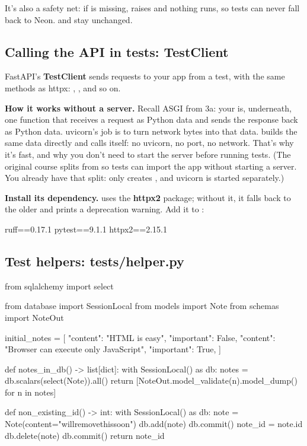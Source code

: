 It's also a safety net: if  is missing,  raises  and nothing runs, so tests can never fall back to Neon.  and  stay unchanged.

\subsection{Calling the API in tests: TestClient}

FastAPI's \textbf{TestClient} sends requests to your app from a test, with the same methods as httpx: , , and so on.

\textbf{How it works without a server.} Recall ASGI from 3a: your  is, underneath, one function that receives a request as Python data and sends the response back as Python data. uvicorn's job is to turn network bytes into that data.  builds the same data directly and calls  itself: no uvicorn, no port, no network. That's why it's fast, and why you don't need to start the server before running tests. (The original course splits  from  so tests can import the app without starting a server. You already have that split:  only creates , and uvicorn is started separately.)

\textbf{Install its dependency.}  uses the \textbf{httpx2} package; without it, it falls back to the older  and prints a deprecation warning. Add it to :

\begin{code}
ruff==0.17.1
pytest==9.1.1
httpx2==2.15.1
\end{code}

\subsection{Test helpers: tests/helper.py}

\begin{py}
from sqlalchemy import select

from database import SessionLocal
from models import Note
from schemas import NoteOut

initial_notes = [
	{"content": "HTML is easy", "important": False},
	{"content": "Browser can execute only JavaScript", "important": True},
]


def notes_in_db() -> list[dict]:
	with SessionLocal() as db:
		notes = db.scalars(select(Note)).all()
		return [NoteOut.model_validate(n).model_dump() for n in notes]


def non_existing_id() -> int:
	with SessionLocal() as db:
		note = Note(content="willremovethissoon")
		db.add(note)
		db.commit()
		note_id = note.id
		db.delete(note)
		db.commit()
	return note_id
\end{py}

